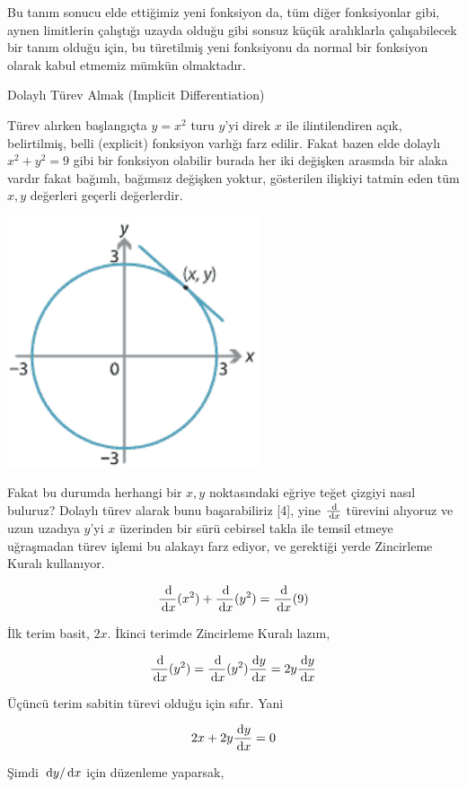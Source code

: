\documentclass[12pt,fleqn]{article}\usepackage{../../common}
\begin{document}
Bu tanım sonucu elde ettiğimiz yeni fonksiyon da, tüm diğer fonksiyonlar
gibi, aynen limitlerin çalıştığı uzayda olduğu gibi sonsuz küçük
aralıklarla çalışabilecek bir tanım olduğu için, bu türetilmiş yeni
fonksiyonu da normal bir fonksiyon olarak kabul etmemiz mümkün olmaktadır.


Dolaylı Türev Almak (Implicit Differentiation)

Türev alırken başlangıçta $y = x^2$ turu $y$'yi direk $x$ ile ilintilendiren
açık, belirtilmiş, belli (explicit) fonksiyon varlığı farz edilir. Fakat bazen
elde dolaylı $x^2+y^2 = 9$ gibi bir fonksiyon olabilir burada her iki değişken
arasında bir alaka vardır fakat bağımlı, bağımsız değişken yoktur, gösterilen
ilişkiyi tatmin eden tüm $x,y$ değerleri geçerli değerlerdir. 

\includegraphics[width=20em]{ode_mattuck_93_diff_03.png}

Fakat bu durumda herhangi bir $x,y$ noktasındaki eğriye teğet çizgiyi nasıl
buluruz? Dolaylı türev alarak bunu başarabiliriz [4], yine $\frac{\,\mathrm{d}}{\,\mathrm{d} x}$
türevini alıyoruz ve uzun uzadıya $y$'yi $x$ üzerinden bir sürü cebirsel takla
ile temsil etmeye uğraşmadan türev işlemi bu alakayı farz ediyor, ve gerektiği
yerde Zincirleme Kuralı kullanıyor.

$$
\frac{\,\mathrm{d}}{\,\mathrm{d} x} (x^2)  + \frac{\,\mathrm{d}}{\,\mathrm{d} x} (y^2) = \frac{\,\mathrm{d}}{\,\mathrm{d} x} (9)
$$

İlk terim basit, $2x$. İkinci terimde Zincirleme Kuralı lazım,

$$
\frac{\,\mathrm{d}}{\,\mathrm{d} x} (y^2) = \frac{\,\mathrm{d}}{\,\mathrm{d} x} (y^2) \frac{\,\mathrm{d} y}{\,\mathrm{d} x} =
2y \frac{\,\mathrm{d} y}{\,\mathrm{d} x}
$$

Üçüncü terim sabitin türevi olduğu için sıfır. Yani

$$
2x + 2y \frac{\,\mathrm{d} y}{\,\mathrm{d} x} = 0
$$

Şimdi $\,\mathrm{d} y / \,\mathrm{d} x$ için düzenleme yaparsak,
\end{document}
